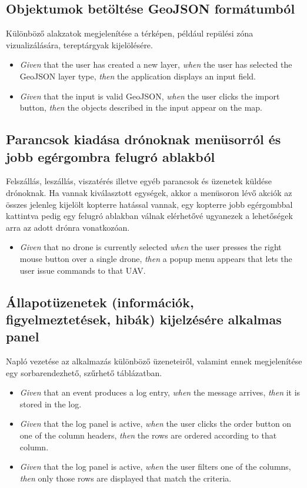 \subsection{Objektumok betöltése GeoJSON formátumból}

Különböző alakzatok megjelenítése a térképen, például repülési zóna vizualizálására, tereptárgyak kijelölésére.

\begin {itemize}
  \item \textit{Given} that the user has created a new layer, \textit{when} the user has selected the GeoJSON layer type, \textit{then} the application displays an input field.
  \item \textit{Given} that the input is valid GeoJSON, \textit{when} the user clicks the import button, \textit{then} the objects described in the input appear on the map.
\end {itemize}


\subsection{Parancsok kiadása drónoknak menüsorról és jobb egérgombra felugró ablakból}

Felszállás, leszállás, viszatérés illetve egyéb parancsok és üzenetek küldése drónoknak. Ha vannak kiválasztott egységek, akkor a menüsoron lévő akciók az összes jelenleg kijelölt kopterre hatással vannak, egy kopterre jobb egérgombbal kattintva pedig egy felugró ablakban válnak elérhetővé ugyanezek a lehetőségek arra az adott drónra vonatkozóan.

\begin {itemize}
  \item \textit{Given} that no drone is currently selected \textit{when} the user presses the right mouse button over a single drone, \textit{then} a popup menu appears that lets the user issue commands to that UAV.
\end {itemize}


\subsection{Állapotüzenetek (információk, figyelmeztetések, hibák) kijelzésére alkalmas panel}

Napló vezetése az alkalmazás különböző üzeneteiről, valamint ennek megjelenítése egy sorbarendezhető, szűrhető táblázatban.

\begin {itemize}
  \item \textit{Given} that an event produces a log entry, \textit{when} the message arrives, \textit{then} it is stored in the log.
  \item \textit{Given} that the log panel is active, \textit{when} the user clicks the order button on one of the column headers, \textit{then} the rows are ordered according to that column.
  \item \textit{Given} that the log panel is active, \textit{when} the user filters one of the columns, \textit{then} only those rows are displayed that match the criteria.
\end {itemize}


